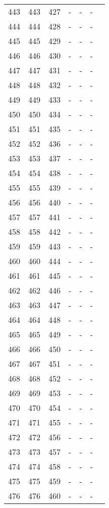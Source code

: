 \begin{longtable}{rrrllll}
  443 & 443 & 427 & - & - & - &  \\ 
  444 & 444 & 428 & - & - & - &  \\ 
  445 & 445 & 429 & - & - & - &  \\ 
  446 & 446 & 430 & - & - & - &  \\ 
  447 & 447 & 431 & - & - & - &  \\ 
  448 & 448 & 432 & - & - & - &  \\ 
  449 & 449 & 433 & - & - & - &  \\ 
  450 & 450 & 434 & - & - & - &  \\ 
  451 & 451 & 435 & - & - & - &  \\ 
  452 & 452 & 436 & - & - & - &  \\ 
  453 & 453 & 437 & - & - & - &  \\ 
  454 & 454 & 438 & - & - & - &  \\ 
  455 & 455 & 439 & - & - & - &  \\ 
  456 & 456 & 440 & - & - & - &  \\ 
  457 & 457 & 441 & - & - & - &  \\ 
  458 & 458 & 442 & - & - & - &  \\ 
  459 & 459 & 443 & - & - & - &  \\ 
  460 & 460 & 444 & - & - & - &  \\ 
  461 & 461 & 445 & - & - & - &  \\ 
  462 & 462 & 446 & - & - & - &  \\ 
  463 & 463 & 447 & - & - & - &  \\ 
  464 & 464 & 448 & - & - & - &  \\ 
  465 & 465 & 449 & - & - & - &  \\ 
  466 & 466 & 450 & - & - & - &  \\ 
  467 & 467 & 451 & - & - & - &  \\ 
  468 & 468 & 452 & - & - & - &  \\ 
  469 & 469 & 453 & - & - & - &  \\ 
  470 & 470 & 454 & - & - & - &  \\ 
  471 & 471 & 455 & - & - & - &  \\ 
  472 & 472 & 456 & - & - & - &  \\ 
  473 & 473 & 457 & - & - & - &  \\ 
  474 & 474 & 458 & - & - & - &  \\ 
  475 & 475 & 459 & - & - & - &  \\ 
  476 & 476 & 460 & - & - & - &  \\ 

\end{longtable}

